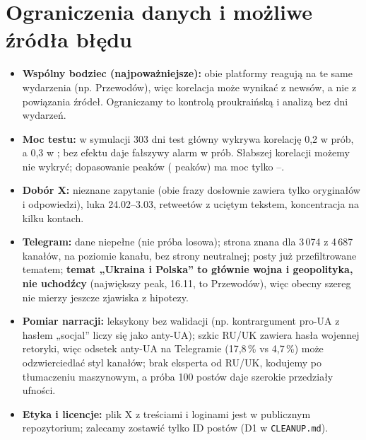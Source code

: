 \documentclass[10pt,a4paper]{article}
\begin{document}
\section{Ograniczenia danych i możliwe źródła błędu}
\begin{itemize}
\item \textbf{Wspólny bodziec (najpoważniejsze):} obie platformy reagują na te same wydarzenia (np. Przewodów), więc korelacja może wynikać z newsów, a nie z powiązania źródeł.
Ograniczamy to kontrolą proukraińską i analizą bez dni wydarzeń.
\item \textbf{Moc testu:} w symulacji 303 dni test główny wykrywa korelację 0,2 w \EdaPowerRhoLow{} prób, a 0,3 w \EdaPowerRhoHigh; bez efektu daje fałszywy alarm w \EdaPowerNull{} prób.
Słabszej korelacji możemy nie wykryć; dopasowanie peaków (\EdaNPeaks{} peaków) ma moc tylko \EdaPowerHalf--\EdaPowerHigh.
\item \textbf{Dobór X:} nieznane zapytanie (obie frazy dosłownie zawiera tylko \EdaShareBothOrig{} oryginałów i odpowiedzi), luka 24.02--3.03, \EdaShareTrunc{} retweetów z uciętym tekstem,
koncentracja na kilku kontach.
\item \textbf{Telegram:} dane niepełne (nie próba losowa); strona znana dla 3\,074 z 4\,687 kanałów, na poziomie kanału, bez strony neutralnej; posty już przefiltrowane tematem;
\textbf{temat „Ukraina i Polska” to głównie wojna i geopolityka, nie uchodźcy} (największy peak, 16.11, to Przewodów), więc obecny szereg nie mierzy jeszcze zjawiska z hipotezy.
\item \textbf{Pomiar narracji:} leksykony bez walidacji (np. kontrargument pro-UA z hasłem „socjal” liczy się jako anty-UA); szkic RU/UK zawiera hasła wojennej retoryki, więc odsetek anty-UA
na Telegramie (17,8\,\% vs 4,7\,\%) może odzwierciedlać styl kanałów; brak eksperta od RU/UK, kodujemy po tłumaczeniu maszynowym, a próba 100 postów daje szerokie przedziały ufności.
\item \textbf{Etyka i licencje:} plik X z treściami i loginami jest w publicznym repozytorium; zalecamy zostawić tylko ID postów (D1 w \texttt{CLEANUP.md}).
\end{itemize}
\end{document}
